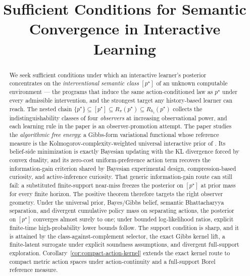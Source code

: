 \documentclass[11pt]{article}
\title{Sufficient Conditions for Semantic Convergence in Interactive Learning}
\author{}
\date{}
\theoremstyle{definition}
\theoremstyle{remark}
\begin{document}
\maketitle

\begin{abstract}
We seek sufficient conditions under which an interactive learner's posterior concentrates on the \emph{interventional semantic class} $[p^\star]$ of an unknown computable environment --- the programs that induce the same action-conditioned law as $p^\star$ under every admissible intervention, and the strongest target any history-based learner can reach. The nested chain $\{p^\star\}\subseteq[p^\star]\subseteq R_\pi(p^\star)\subseteq R_{h_t}(p^\star)$ collects the indistinguishability classes of four \emph{observers} at increasing observational power, and each learning rule in the paper is an observer-promotion attempt. The paper studies the \emph{algorithmic free energy}: a Gibbs-form variational functional whose reference measure is the Kolmogorov-complexity-weighted universal interactive prior of \citet{Solomonoff1964a,Solomonoff1964b,Kolmogorov1965,Hutter2005}. Its belief-side minimization is exactly Bayesian updating with the KL divergence forced by convex duality, and its zero-cost uniform-preference action term recovers the information-gain criterion shared by Bayesian experimental design, compression-based curiosity, and active-inference curiosity. That generic information-gain route can still fail: a substituted finite-support near-miss freezes the posterior on $[p^\star]$ at prior mass for every finite horizon. The positive theorem therefore targets the right observer geometry. Under the universal prior, Bayes/Gibbs belief, semantic Bhattacharyya separation, and divergent cumulative policy mass on separating actions, the posterior on $[p^\star]$ converges almost surely to one; under bounded log-likelihood ratios, explicit finite-time high-probability lower bounds follow. The support condition is sharp, and it is attained by the class-against-complement selector, the exact Gibbs kernel lift, a finite-latent surrogate under explicit soundness assumptions, and divergent full-support exploration. Corollary~\ref{cor:compact-action-kernel} extends the exact kernel route to compact metric action spaces under action-continuity and a full-support Borel reference measure.


\end{abstract}
\end{document}
